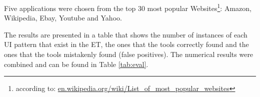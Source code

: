 \documentclass[conference]{IEEEtran}
\begin{document}
Five applications were chosen from the top 30 most popular Websites\footnote{according to: \url{en.wikipedia.org/wiki/List_of_most_popular_websites‎}}: Amazon, Wikipedia, Ebay, Youtube and Yahoo.

The results are presented in a table that shows the number of instances of each UI pattern that exist in the ET, the ones that the tools correctly found and the ones that the tools mistakenly found (false positives). The numerical results were combined and can be found in Table \ref{tab:eval}.

\begin{table}[!htb]
\caption{Evaluation set results.}
\label{tab:eval}
\end{table}
\end{document}
